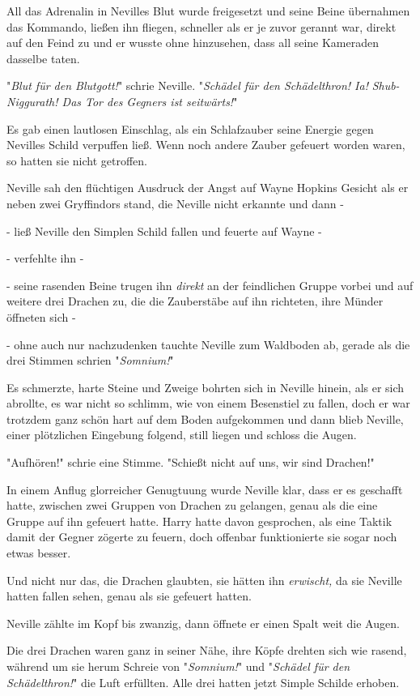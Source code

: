 {All das Adrenalin in Nevilles Blut wurde freigesetzt und seine Beine übernahmen das Kommando, ließen ihn fliegen, schneller als er je zuvor gerannt war, direkt auf den Feind zu und er wusste ohne hinzusehen, dass all seine Kameraden dasselbe taten.

"\emph{Blut für den Blutgott!}" schrie Neville. "\emph{Schädel für den Schädelthron! Ia!} \emph{Shub-Niggurath! Das Tor des Gegners ist seitwärts!}"

Es gab einen lautlosen Einschlag, als ein Schlafzauber seine Energie gegen Nevilles Schild verpuffen ließ. Wenn noch andere Zauber gefeuert worden waren, so hatten sie nicht getroffen.

Neville sah den flüchtigen Ausdruck der Angst auf Wayne Hopkins Gesicht als er neben zwei Gryffindors stand, die Neville nicht erkannte und dann -

- ließ Neville den Simplen Schild fallen und feuerte auf Wayne -

- verfehlte ihn -

- seine rasenden Beine trugen ihn \emph{direkt} an der feindlichen Gruppe vorbei und auf weitere drei Drachen zu, die die Zauberstäbe auf ihn richteten, ihre Münder öffneten sich -

- ohne auch nur nachzudenken tauchte Neville zum Waldboden ab, gerade als die drei Stimmen schrien "\emph{Somnium!}"

Es schmerzte, harte Steine und Zweige bohrten sich in Neville hinein, als er sich abrollte, es war nicht so schlimm, wie von einem Besenstiel zu fallen, doch er war trotzdem ganz schön hart auf dem Boden aufgekommen und dann blieb Neville, einer plötzlichen Eingebung folgend, still liegen und schloss die Augen.

"Aufhören!" schrie eine Stimme. "Schießt nicht auf uns, wir sind Drachen!"

In einem Anflug glorreicher Genugtuung wurde Neville klar, dass er es geschafft hatte, zwischen zwei Gruppen von Drachen zu gelangen, genau als die eine Gruppe auf ihn gefeuert hatte. Harry hatte davon gesprochen, als eine Taktik damit der Gegner zögerte zu feuern, doch offenbar funktionierte sie sogar noch etwas besser.

Und nicht nur das, die Drachen glaubten, sie hätten ihn \emph{erwischt,} da sie Neville hatten fallen sehen, genau als sie gefeuert hatten.

Neville zählte im Kopf bis zwanzig, dann öffnete er einen Spalt weit die Augen.

Die drei Drachen waren ganz in seiner Nähe, ihre Köpfe drehten sich wie rasend, während um sie herum Schreie von "\emph{Somnium!}" und "\emph{Schädel für den Schädelthron!}" die Luft erfüllten. Alle drei hatten jetzt Simple Schilde erhoben.

}
